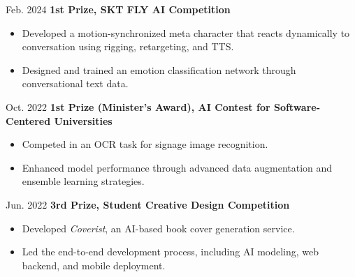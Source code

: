 \documentclass[10pt, letterpaper]{article}
\newenvironment{highlights}{
    \begin{itemize}[
        topsep=0.10 cm,
        parsep=0.10 cm,
        partopsep=0pt,
        itemsep=0pt,
        leftmargin=0.4 cm + 10pt
    ]
}{
    \end{itemize}
} %
\newenvironment{twocolentry_project}[2][]{
    \onecolentry
    \def\secondColumn{#2}
    \setcolumnwidth{\fill, 2.0 cm}
    \begin{paracol}{2}
}{
    \switchcolumn \raggedleft \secondColumn
    \end{paracol}
    \endonecolentry
} %
\begin{document}
    \vspace{0.2 cm}

    \begin{twocolentry_project}{
        Feb. 2024
    }
        \textbf{1st Prize, SKT FLY AI Competition}
        \begin{highlights}
            \item Developed a motion-synchronized meta character that reacts dynamically to conversation using rigging, retargeting, and TTS.
            \item Designed and trained an emotion classification network through conversational text data.
        \end{highlights}
    \end{twocolentry_project}

    \vspace{0.2 cm}

    \begin{twocolentry_project}{
        Oct. 2022
    }
        \textbf{1st Prize (Minister’s Award), AI Contest for Software-Centered Universities}
        \begin{highlights}
            \item Competed in an OCR task for signage image recognition.
            \item Enhanced model performance through advanced data augmentation and ensemble learning strategies.
        \end{highlights}
    \end{twocolentry_project}

    \vspace{0.2 cm}

    \begin{twocolentry_project}{
        Jun. 2022
    }
        \textbf{3rd Prize, Student Creative Design Competition}
        \begin{highlights}
            \item Developed \textit{Coverist}, an AI-based book cover generation service.
            \item Led the end-to-end development process, including AI modeling, web backend, and mobile deployment.
        \end{highlights}
    \end{twocolentry_project}

    \vspace{0.2 cm}




    
\end{document}
